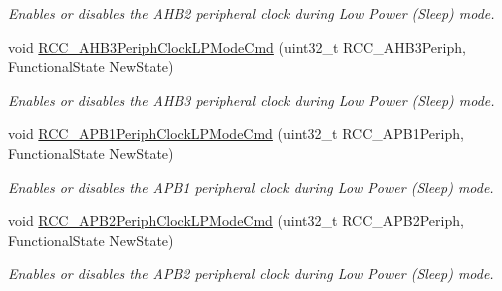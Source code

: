 \begin{DoxyCompactItemize}
\begin{DoxyCompactList}\small\item\em Enables or disables the A\-H\-B2 peripheral clock during Low Power (Sleep) mode. \end{DoxyCompactList}\item 
void \hyperlink{group___r_c_c___group3_ga4e1df07cdfd81c068902d9d35fcc3911}{R\-C\-C\-\_\-\-A\-H\-B3\-Periph\-Clock\-L\-P\-Mode\-Cmd} (uint32\-\_\-t R\-C\-C\-\_\-\-A\-H\-B3\-Periph, Functional\-State New\-State)
\begin{DoxyCompactList}\small\item\em Enables or disables the A\-H\-B3 peripheral clock during Low Power (Sleep) mode. \end{DoxyCompactList}\item 
void \hyperlink{group___r_c_c___group3_ga84dd64badb84768cbcf19e241cadff50}{R\-C\-C\-\_\-\-A\-P\-B1\-Periph\-Clock\-L\-P\-Mode\-Cmd} (uint32\-\_\-t R\-C\-C\-\_\-\-A\-P\-B1\-Periph, Functional\-State New\-State)
\begin{DoxyCompactList}\small\item\em Enables or disables the A\-P\-B1 peripheral clock during Low Power (Sleep) mode. \end{DoxyCompactList}\item 
void \hyperlink{group___r_c_c___group3_ga30365b9e0b4c5d7e98c2675c862ddd7e}{R\-C\-C\-\_\-\-A\-P\-B2\-Periph\-Clock\-L\-P\-Mode\-Cmd} (uint32\-\_\-t R\-C\-C\-\_\-\-A\-P\-B2\-Periph, Functional\-State New\-State)
\begin{DoxyCompactList}\small\item\em Enables or disables the A\-P\-B2 peripheral clock during Low Power (Sleep) mode. \end{DoxyCompactList}\end{DoxyCompactItemize}


